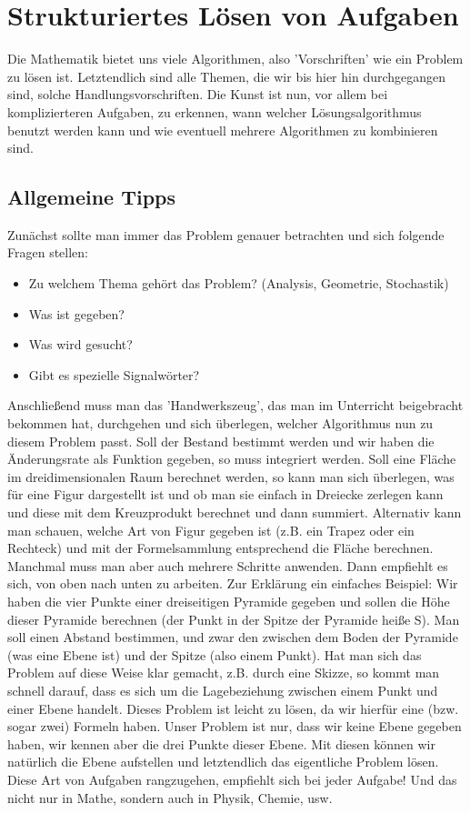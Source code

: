 \chapter{Strukturiertes Lösen von Aufgaben}
	Die Mathematik bietet uns viele Algorithmen, also 'Vorschriften' wie ein
	Problem zu lösen ist. Letztendlich sind alle Themen, die wir bis hier hin
	durchgegangen sind, solche Handlungsvorschriften. Die Kunst ist nun, vor allem
	bei komplizierteren Aufgaben, zu erkennen, wann welcher Lösungsalgorithmus
	benutzt werden kann und wie eventuell mehrere Algorithmen zu kombinieren sind.
	
	\section{Allgemeine Tipps}
		Zunächst sollte man immer das Problem genauer betrachten und sich folgende
		Fragen stellen:
		\begin{itemize}
		  \item Zu welchem Thema gehört das Problem? (Analysis, Geometrie, Stochastik)
		  \item Was ist gegeben?
		  \item Was wird gesucht?
		  \item Gibt es spezielle Signalwörter?
		\end{itemize}
		Anschließend muss man das 'Handwerkszeug', das man im Unterricht beigebracht
		bekommen hat, durchgehen und sich überlegen, welcher Algorithmus nun zu diesem
		Problem passt. Soll der Bestand bestimmt werden und wir haben die Änderungsrate als
		Funktion gegeben, so muss integriert werden. Soll eine Fläche im
		dreidimensionalen Raum berechnet werden, so kann man sich überlegen, was für
		eine Figur dargestellt ist und ob man sie einfach in Dreiecke zerlegen kann und diese mit
		dem Kreuzprodukt berechnet und dann summiert. Alternativ kann man schauen,
		welche Art von Figur gegeben ist (z.B. ein Trapez oder ein Rechteck) und
		mit der Formelsammlung entsprechend die Fläche berechnen.\\
		Manchmal muss man aber auch mehrere Schritte anwenden. Dann empfiehlt es sich,
		von oben nach unten zu arbeiten. Zur Erklärung ein einfaches Beispiel: Wir
		haben die vier Punkte einer dreiseitigen Pyramide gegeben und sollen die Höhe
		dieser Pyramide berechnen (der Punkt in der Spitze der Pyramide heiße S). Man soll einen
		Abstand bestimmen, und zwar den zwischen dem Boden der Pyramide (was eine
		Ebene ist) und der Spitze (also einem Punkt). Hat man sich das Problem auf
		diese Weise klar gemacht, z.B. durch eine Skizze, so kommt man schnell darauf,
		dass es sich um die Lagebeziehung zwischen einem Punkt und einer Ebene
		handelt. Dieses Problem ist leicht zu lösen, da wir hierfür eine (bzw. sogar
		zwei) Formeln haben. Unser Problem ist nur, dass wir keine Ebene gegeben
		haben, wir kennen aber die drei Punkte dieser Ebene. Mit diesen können wir natürlich
		die Ebene aufstellen und letztendlich das eigentliche Problem lösen.\\
		Diese Art von Aufgaben rangzugehen, empfiehlt sich bei jeder Aufgabe! Und
		das nicht nur in Mathe, sondern auch in Physik, Chemie, usw.
		
